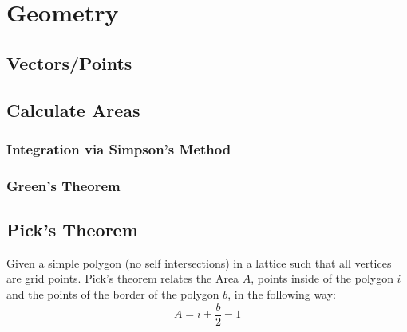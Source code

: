 \documentclass[../Notes/main.tex]{subfiles}
\begin{document}
\section{Geometry}
\subsection{Vectors/Points}


\subsection{Calculate Areas}
\subsubsection{Integration via Simpson's Method}


\subsubsection{Green's Theorem}


\subsection{Pick's Theorem}
Given a simple polygon (no self intersections) in a lattice such that all vertices are grid points. Pick's theorem relates the Area \(A\), points inside of the polygon \(i\) and the points of the border of the polygon \(b\), in the following way:
\begin{equation*}
    A=i+\frac{b}2-1
\end{equation*}
\end{document}
